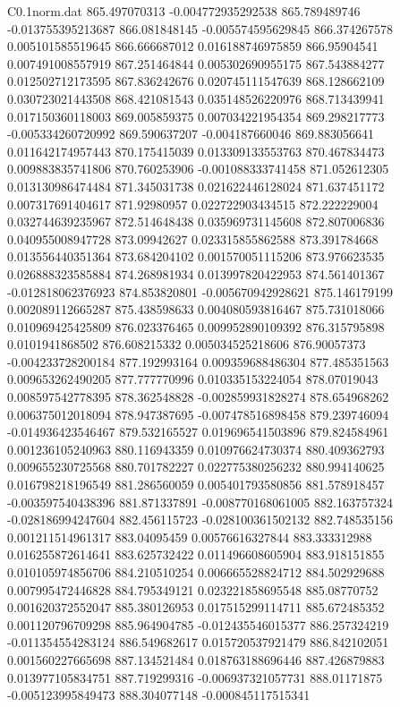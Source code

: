 \begin{filecontents}{C0.1norm.dat}
865.497070313		-0.004772935292538
865.789489746		-0.013755395213687
866.081848145		-0.005574595629845
866.374267578		0.005101585519645
866.666687012		0.016188746975859
866.95904541		0.007491008557919
867.251464844		0.005302690955175
867.543884277		0.012502712173595
867.836242676		0.020745111547639
868.128662109		0.030723021443508
868.421081543		0.035148526220976
868.713439941		0.017150360118003
869.005859375		0.007034221954354
869.298217773		-0.005334260720992
869.590637207		-0.004187660046
869.883056641		0.011642174957443
870.175415039		0.013309133553763
870.467834473		0.009883835741806
870.760253906		-0.001088333741458
871.052612305		0.013130986474484
871.345031738		0.021622446128024
871.637451172		0.007317691404617
871.92980957		0.022722903434515
872.222229004		0.032744639235967
872.514648438		0.035969731145608
872.807006836		0.040955008947728
873.09942627		0.023315855862588
873.391784668		0.013556440351364
873.684204102		0.001570051115206
873.976623535		0.026888323585884
874.268981934		0.013997820422953
874.561401367		-0.012818062376923
874.853820801		-0.005670942928621
875.146179199		0.002089112665287
875.438598633		0.004080593816467
875.731018066		0.010969425425809
876.023376465		0.009952890109392
876.315795898		0.0101941868502
876.608215332		0.005034525218606
876.90057373		-0.004233728200184
877.192993164		0.009359688486304
877.485351563		0.009653262490205
877.777770996		0.010335153224054
878.07019043		0.008597542778395
878.362548828		-0.002859931828274
878.654968262		0.006375012018094
878.947387695		-0.007478516898458
879.239746094		-0.014936423546467
879.532165527		0.019696541503896
879.824584961		0.001236105240963
880.116943359		0.010976624730374
880.409362793		0.009655230725568
880.701782227		0.022775380256232
880.994140625		0.016798218196549
881.286560059		0.005401793580856
881.578918457		-0.003597540438396
881.871337891		-0.008770168061005
882.163757324		-0.028186994247604
882.456115723		-0.028100361502132
882.748535156		0.001211514961317
883.04095459		0.00576616327844
883.333312988		0.016255872614641
883.625732422		0.011496608605904
883.918151855		0.010105974856706
884.210510254		0.006665528824712
884.502929688		0.007995472446828
884.795349121		0.023221858695548
885.08770752		0.001620372552047
885.380126953		0.017515299114711
885.672485352		0.001120796709298
885.964904785		-0.012435546015377
886.257324219		-0.011354554283124
886.549682617		0.015720537921479
886.842102051		0.001560227665698
887.134521484		0.018763188696446
887.426879883		0.013977105834751
887.719299316		-0.006937321057731
888.01171875		-0.005123995849473
888.304077148		-0.000845117515341

\end{filecontents}
